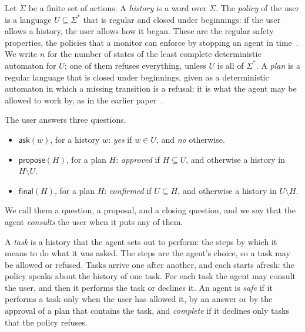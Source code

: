 \documentclass[acmsmall,nonacm,screen]{acmart}
\newcommand{\kw}[1]{\mathsf{#1}}
\newcommand{\ask}[1]{\kw{ask}(#1)}
\newcommand{\propose}[1]{\kw{propose}(#1)}
\newcommand{\final}[1]{\kw{final}(#1)}
\begin{document}
Let $\Sigma$ be a finite set of actions. A \emph{history} is a word over $\Sigma$. The
\emph{policy} of the user is a language $U \subseteq \Sigma^{*}$ that is regular and closed
under beginnings: if the user allows a history, the user allows how it began. These are the
regular safety properties, the policies that a monitor can enforce by stopping an agent in
time~\cite{schneider2000}. We write $n$ for the number of states of the least complete
deterministic automaton for $U$; one of them refuses everything, unless $U$ is all of
$\Sigma^{*}$. A \emph{plan} is a regular language that is closed under beginnings, given as
a deterministic automaton in which a missing transition is a refusal; it is what the agent
may be allowed to work by, as in the earlier paper~\cite{tpp11}.

The user answers three questions.
\begin{itemize}
\item $\ask{w}$, for a history $w$: \emph{yes} if $w \in U$, and \emph{no} otherwise.
\item $\propose{H}$, for a plan $H$: \emph{approved} if $H \subseteq U$, and otherwise a
  history in $H \setminus U$.
\item $\final{H}$, for a plan $H$: \emph{confirmed} if $U \subseteq H$, and otherwise a
  history in $U \setminus H$.
\end{itemize}
We call them a question, a proposal, and a closing question, and we say that the agent
\emph{consults} the user when it puts any of them.

A \emph{task} is a history that the agent sets out to perform: the steps by which it means
to do what it was asked. The steps are the agent's choice, so a task may be allowed or
refused. Tasks arrive one after another, and each starts afresh: the policy speaks about the
history of one task. For each task the agent may consult the user, and then it performs the
task or declines it. An agent is \emph{safe} if it performs a task only when the user has
allowed it, by an answer or by the approval of a plan that contains the task, and
\emph{complete} if it declines only tasks that the policy refuses.
\end{document}
